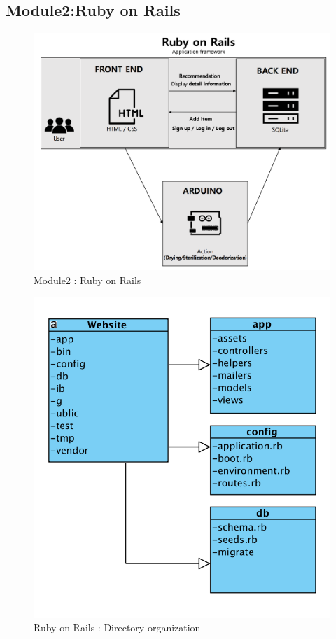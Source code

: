 \documentclass[conference]{IEEEtran}
\begin{document}
\subsection{Module2:Ruby on Rails}
\begin{figure}[H]
\begin{center}
    \includegraphics[scale=0.38]{module2}
    \caption{Module2 : Ruby on Rails} \label{fig:label}
\end{center}
\end{figure}
\begin{figure}[H]
\begin{center}
    \includegraphics[scale=0.58]{rubyonrails}
  \caption{Ruby on Rails : Directory organization}\label{fig:label}
\end{center}
\end{figure}
\end{document}
